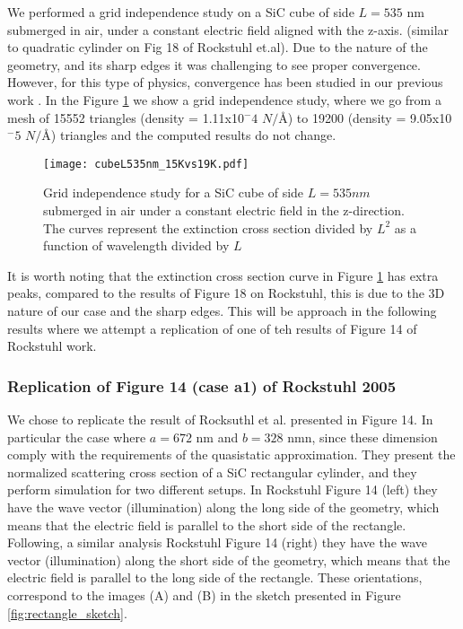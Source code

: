 We performed a grid independence study on a SiC cube of side $L=535$ nm submerged in air, under a 
constant electric field aligned with the z-axis.
(similar to quadratic cylinder on Fig 18 of Rockstuhl et.al). 
Due to the nature of the geometry, and its sharp edges it was challenging to see proper convergence. However,
for this type of physics, convergence has been studied in our previous work \cite{ClementiETal2019}. 
In the Figure \ref{fig:cube535} we show a grid independence study, where we go from a mesh of 15552 
triangles (density = 1.11x10$^-4$ $N/\text{\AA}$) to 19200 (density = 9.05x10$^-5$ $N/\text{\AA}$) 
triangles and the computed results do not change.

\begin{figure}
    \centering
    \texttt{[image: cubeL535nm\_15Kvs19K.pdf]} 
    \caption{Grid independence study for a SiC cube of side $L=535 nm$ submerged in air under a constant 
    electric field in the z-direction. The curves represent the extinction cross section divided by $L^2$ 
    as a function of wavelength divided by $L$}
    \label{fig:cube535}
 \end{figure}

It is worth noting that the extinction cross section curve in Figure \ref{fig:cube535} has extra peaks, 
compared to the results of Figure 18 on Rockstuhl, this is due to the 3D nature of our case and the sharp 
edges. This will be approach in the following results where we attempt a replication of one of teh results 
of Figure 14 of Rockstuhl work.

\subsubsection{Replication of Figure 14 (case a1) of Rockstuhl 2005}

We chose to replicate the result of Rocksuthl et al. presented in Figure 14. In particular the case where $a=672$ nm 
and $b=328$ nmn, since these dimension comply with the requirements of the quasistatic approximation.
They present the normalized scattering cross section of a SiC rectangular cylinder, and they perform simulation 
for two different setups. In Rockstuhl Figure 14 (left) they have the wave vector (illumination) along the long 
side of the geometry, which means that the electric field is parallel to the short side of the rectangle. Following, 
a similar analysis Rockstuhl Figure 14 (right) they have the wave vector (illumination) along the short
side of the geometry, which means that the electric field is parallel to the long side of the rectangle. These orientations,
correspond to the images (A) and (B) in the sketch presented in Figure \ref{fig:rectangle_sketch}.

